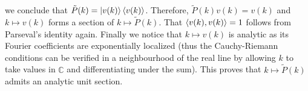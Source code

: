 \documentclass[a4paper,11pt]{article}
\newcommand{\C}{\mathbb{C}}
\numberwithin{equation}{section}
\begin{document}
 	 we conclude that $ \tilde{P}(k)=\ket{v(k)}\braket{v(k)} $. Therefore, $ \tilde{P}(k)v(k)=v(k) $ and $ k\mapsto v(k) $ forms a section of $ k\mapsto\tilde{P}(k) $. That $ \braket{v(k),v(k)}=1 $ follows from Parseval's identity again. Finally we notice that $ k\mapsto v(k) $ is analytic as its Fourier coefficients are exponentially localized (thus the Cauchy-Riemann conditions can be verified in a neighbourhood of the real line by allowing $ k $ to take values in $ \C $ and differentiating under the sum). This proves that $ k\mapsto \tilde{P}(k) $ admits an analytic unit section.
\end{document}
